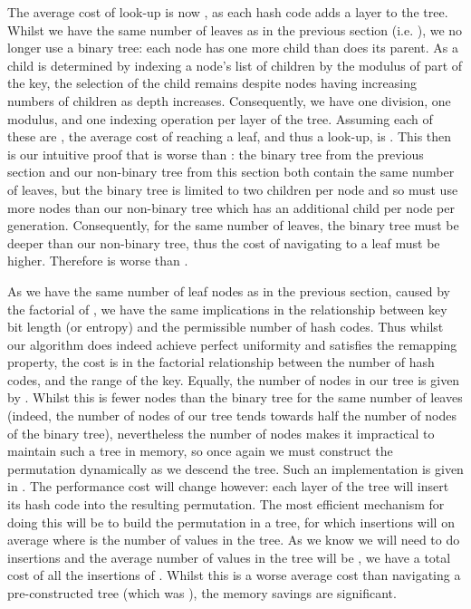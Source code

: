 \documentclass[runningheads,a4paper]{llncs}
\begin{document}
The average cost of look-up is now , as each hash code
adds a layer to the tree. Whilst we have the same number of leaves as
in the previous section (i.e. ), we no longer use a binary tree:
each node has one more child than does its parent. As a child is
determined by indexing a node's list of children by the modulus of
part of the key, the selection of the child remains  despite
nodes having increasing numbers of children as depth
increases. Consequently, we have one division, one modulus, and one
indexing operation per layer of the tree. Assuming each of these are
, the average cost of reaching a leaf, and thus a look-up,
is . This then is our intuitive proof that
 is worse than : the binary tree from
the previous section and our non-binary tree from this section both
contain the same number of leaves, but the binary tree is limited to
two children per node and so must use more nodes than our non-binary
tree which has an additional child per node per
generation. Consequently, for the same number of leaves, the binary
tree must be deeper than our non-binary tree, thus the cost of
navigating to a leaf must be higher. Therefore 
is worse than .

As we have the same number of leaf nodes as in the previous section,
caused by the factorial of , we have the same implications in the
relationship between key bit length (or entropy) and the permissible
number of hash codes. Thus whilst our algorithm does indeed achieve
perfect uniformity and satisfies the remapping property, the cost is
in the factorial relationship between the number of hash codes, and
the range of the key. Equally, the number of nodes in our tree is
given by . Whilst this is fewer nodes
than the binary tree for the same number of leaves (indeed, the number
of nodes of our tree tends towards half the number of nodes of the
binary tree), nevertheless the number of nodes makes it impractical to
maintain such a tree in memory, so once again we must construct the
permutation dynamically as we descend the tree. Such an implementation
is given in . The performance cost will change
however: each layer of the tree will insert its hash code into the
resulting permutation. The most efficient mechanism for doing this
will be to build the permutation in a tree, for which insertions will
on average  where  is the number of values in the
tree. As we know we will need to do  insertions and the average
number of values in the tree will be , we have a total cost of
all the insertions of . Whilst this is
a worse average cost than navigating a pre-constructed tree (which was
), the memory savings are significant.
\end{document}
